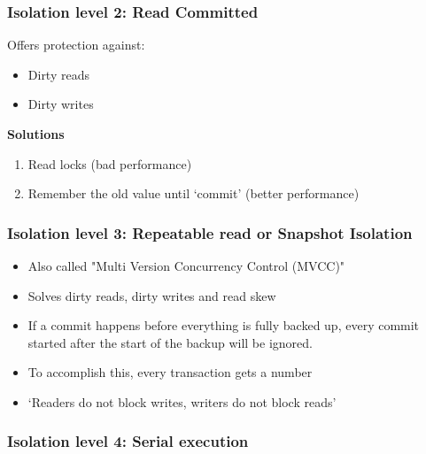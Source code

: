 \documentclass{article}
\begin{document}
\subsubsection{Isolation level 2: Read Committed}

Offers protection against:

\begin{itemize}
    \item Dirty reads
    \item Dirty writes
\end{itemize}

\textbf{Solutions}

\begin{enumerate}
    \item Read locks (bad performance)
    \item Remember the old value until `commit' (better performance)
\end{enumerate}

\subsubsection{Isolation level 3: Repeatable read or Snapshot Isolation}

\begin{itemize}
    \item Also called "Multi Version Concurrency Control (MVCC)"
    \item Solves dirty reads, dirty writes and read skew
    \item If a commit happens before everything is fully backed up, every commit started after the start of the backup will be ignored.
    \item To accomplish this, every transaction gets a number
    \item `Readers do not block writes, writers do not block reads'
\end{itemize}


\subsubsection{Isolation level 4: Serial execution }
\end{document}
